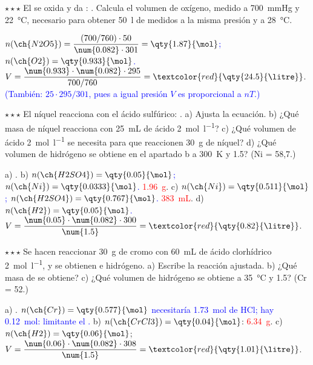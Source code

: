 \begin{exercise}
    \(\star\star\star\) El  se oxida y da : . Calcula el volumen de oxígeno,
    medido a \qty{700}{\mmHg} y \qty{22}{\degreeCelsius}, necesario para obtener \qty{50}{\litre} de  medidos a la misma
    presión y a \qty{28}{\degreeCelsius}.
    \begin{solu}
        \textcolor{blue}{\(n(\ch{N2O5}) = \dfrac{(700/760) \cdot 50}{\num{0.082} \cdot 301} = \qty{1.87}{\mol}\); \(n(\ch{O2}) = \qty{0.933}{\mol}\).}
        \(V = \dfrac{\num{0.933} \cdot \num{0.082} \cdot 295}{700/760} = \textcolor{red}{\qty{24.5}{\litre}}\).
        \textcolor{blue}{(También: \(25 \cdot 295/301\), pues a igual presión \(V\) es proporcional a \(nT\).)}
    \end{solu}
\end{exercise}

\begin{exercise}
    \(\star\star\star\) El níquel reacciona con el ácido sulfúrico: . a) Ajusta la ecuación.
    b) ¿Qué masa de níquel reacciona con \qty{25}{\mL} de ácido \qty{2}{\mol\per\litre}? c) ¿Qué volumen de ácido
    \qty{2}{\mol\per\litre} se necesita para que reaccionen \qty{30}{\gram} de níquel? d) ¿Qué volumen de hidrógeno se obtiene en
    el apartado b a \qty{300}{\kelvin} y \qty{1.5}{\atm}? (Ni = 58,7.)
    \begin{solu}
        a) \textcolor{red}{}. b) \textcolor{blue}{\(n(\ch{H2SO4}) = \qty{0.05}{\mol}\);
        \(n(\ch{Ni}) = \qty{0.0333}{\mol}\).} \textcolor{red}{\qty{1.96}{\gram}}. c) \textcolor{blue}{\(n(\ch{Ni}) = \qty{0.511}{\mol}\);
        \(n(\ch{H2SO4}) = \qty{0.767}{\mol}\).} \textcolor{red}{\qty{383}{\mL}}. d) \textcolor{blue}{\(n(\ch{H2}) = \qty{0.05}{\mol}\).}
        \(V = \dfrac{\num{0.05} \cdot \num{0.082} \cdot 300}{\num{1.5}} = \textcolor{red}{\qty{0.82}{\litre}}\).
    \end{solu}
\end{exercise}

\begin{exercise}
    \(\star\star\star\) Se hacen reaccionar \qty{30}{\gram} de cromo con \qty{60}{\mL} de ácido clorhídrico
    \qty{2}{\mol\per\litre}, y se obtienen  e hidrógeno. a) Escribe la reacción ajustada. b) ¿Qué masa de  se
    obtiene? c) ¿Qué volumen de hidrógeno se obtiene a \qty{35}{\degreeCelsius} y \qty{1.5}{\atm}? (Cr = 52.)
    \begin{solu}
        a) \textcolor{red}{}. \textcolor{blue}{\(n(\ch{Cr}) = \qty{0.577}{\mol}\) necesitaría
        \qty{1.73}{\mol} de HCl; hay \qty{0.12}{\mol}: limitante el .} b) \(n(\ch{CrCl3}) = \qty{0.04}{\mol}\):
        \textcolor{red}{\qty{6.34}{\gram}}. c) \(n(\ch{H2}) = \qty{0.06}{\mol}\); \(V = \dfrac{\num{0.06} \cdot \num{0.082} \cdot 308}{\num{1.5}}
        = \textcolor{red}{\qty{1.01}{\litre}}\).
    \end{solu}
\end{exercise}

